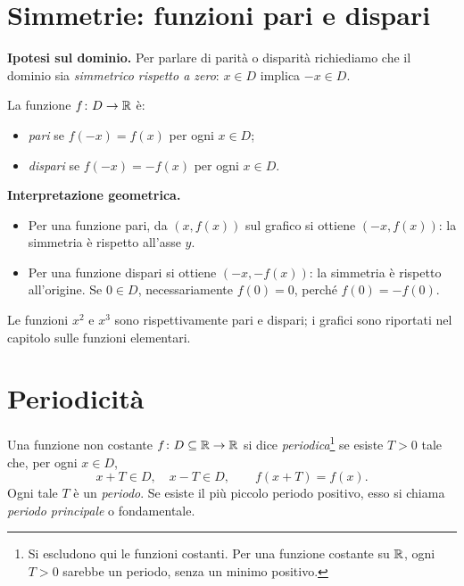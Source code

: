 \begin{schema}
\end{schema}

\section{Simmetrie: funzioni pari e dispari}

\textbf{Ipotesi sul dominio.} Per parlare di parità o disparità richiediamo che il dominio sia \emph{simmetrico rispetto a zero}: $x\in D$ implica $-x\in D$.

\begin{definizione}
La funzione $f\colon D\to\mathbb{R}$ è:
\begin{itemize}
  \item \emph{pari} se $f(-x)=f(x)$ per ogni $x\in D$;
  \item \emph{dispari} se $f(-x)=-f(x)$ per ogni $x\in D$.
\end{itemize}
\end{definizione}

\textbf{Interpretazione geometrica.}
\begin{itemize}
  \item Per una funzione pari, da $(x,f(x))$ sul grafico si ottiene $(-x,f(x))$: la simmetria è rispetto all'asse $y$.
  \item Per una funzione dispari si ottiene $(-x,-f(x))$: la simmetria è rispetto all'origine. Se $0\in D$, necessariamente $f(0)=0$, perché $f(0)=-f(0)$.
\end{itemize}
\begin{esempio}
Le funzioni $x^2$ e $x^3$ sono rispettivamente pari e dispari; i grafici sono riportati nel capitolo sulle funzioni elementari.
\end{esempio}

\section{Periodicità}

\begin{definizione}
Una funzione non costante $f\colon D\subseteq\mathbb{R}\to\mathbb{R}$ si dice \emph{periodica}\footnote{Si escludono qui le funzioni costanti. Per una funzione costante su $\mathbb{R}$, ogni $T>0$ sarebbe un periodo, senza un minimo positivo.} se esiste $T>0$ tale che, per ogni $x\in D$,
\[
x+T\in D,\quad x-T\in D,\qquad f(x+T)=f(x).
\]
Ogni tale $T$ è un \emph{periodo}. Se esiste il più piccolo periodo positivo, esso si chiama \emph{periodo principale} o fondamentale.
\end{definizione}

